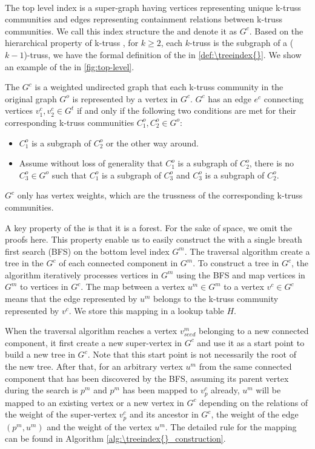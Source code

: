 ~\\The top level index is a super-graph having vertices representing unique k-truss communities and edges representing containment relations between k-truss communities. We call this index structure the \treeindex{} and denote it as $G^c$. Based on the hierarchical property of k-truss \cite{cohen2008trusses}, \ie for $k \ge 2$, each $k$-truss is the subgraph of a ($k-1$)-truss, we have the formal definition of the \treeindex{} in \autoref{def:\treeindex{}}. We show an example of the \treeindex{} in \autoref{fig:top-level}.

\begin{Def}[\Treeindex{}]
The \treeindex{} $G^c$ is a weighted undirected graph that each k-truss community in the original graph $G^o$ is represented by a vertex in $G^c$. $G^c$ has an edge $e^c$ connecting vertices $v^{c}_{1}, v^{c}_{2} \in G^{t}$ if and only if the following two conditions are met for their corresponding k-truss communities $C^{o}_{1}, C^{o}_{2} \in G^{o}$:
\begin{itemize}
	\item $C^{o}_{1}$ is a subgraph of $C^{o}_{2}$ or the other way around.
	\item Assume without loss of generality that $C^{o}_{1}$ is a subgraph of $C^{o}_{2}$, there is no $C^{o}_{3} \in G^{o}$ such that $C^{o}_{1}$ is a subgraph of $C^{o}_{3}$ and $C^{o}_{3}$ is a subgraph of $C^{o}_{2}$.
\end{itemize}
$G^c$ only has vertex weights, which are the trussness of the corresponding k-truss communities.
\label{def:\treeindex{}}
\end{Def}

A key property of the \treeindex{} is that it is a forest. For the sake of space, we omit the proofs here. This property enable us to easily construct the \treeindex{} with a single breath first search (BFS) on the bottom level index $G^m$. The traversal algorithm create a tree in the \treeindex{} $G^c$ of each connected component in $G^m$. To construct a tree in $G^c$, the algorithm iteratively processes vertices in $G^m$ using the BFS and map vertices in $G^m$ to vertices in $G^c$. The map between a vertex $u^m \in G^m$ to a vertex $v^c \in G^c$ means that the edge represented by $u^m$ belongs to the k-truss community represented by $v^c$. We store this mapping in a lookup table $H$. 

When the traversal algorithm reaches a vertex $v^{m}_{seed}$ belonging to a new connected component, it first create a new super-vertex in $G^c$ and use it as a start point to build a new tree in $G^c$. Note that this start point is not necessarily the root of the new tree. After that, for an arbitrary vertex $u^m$ from the same connected component that has been discovered by the BFS, assuming its parent vertex during the search is $p^m$ and $p^m$ has been mapped to $v^{c}_{p}$ already, $u^m$ will be mapped to an existing vertex or a new vertex in $G^c$ depending on the relations of the weight of the super-vertex $v^{c}_{p}$ and its ancestor in $G^c$, the weight of the edge $(p^m, u^m)$ and the weight of the vertex $u^m$. The detailed rule for the mapping can be found in Algorithm \ref{alg:\treeindex{}_construction}.

